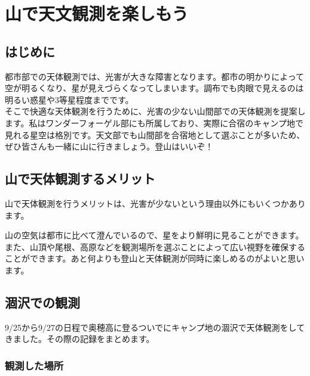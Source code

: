 \documentclass[../main]{subfiles}
\begin{document}
\chapter{山で天文観測を楽しもう} %


\section{はじめに}
都市部での天体観測では、光害が大きな障害となります。都市の明かりによって空が明るくなり、星が見えづらくなってしまいます。調布でも肉眼で見えるのは明るい惑星や3等星程度までです。\\
そこで快適な天体観測を行うために、光害の少ない山間部での天体観測を提案します。私はワンダーフォーゲル部にも所属しており、実際に合宿のキャンプ地で見れる星空は格別です。天文部でも山間部を合宿地として選ぶことが多いため、ぜひ皆さんも一緒に山に行きましょう。登山はいいぞ！

\section{山で天体観測するメリット}
山で天体観測を行うメリットは、光害が少ないという理由以外にもいくつかあります。

山の空気は都市に比べて澄んでいるので、星をより鮮明に見ることができます。また、山頂や尾根、高原などを観測場所を選ぶことによって広い視野を確保することができます。あと何よりも登山と天体観測が同時に楽しめるのがよいと思います。

\section{涸沢での観測}

9/25から9/27の日程で奥穂高に登るついでにキャンプ地の涸沢で天体観測をしてきました。その際の記録をまとめます。

\subsection{観測した場所}
\end{document}
